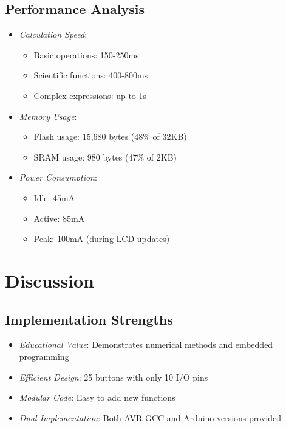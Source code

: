 \documentclass{article}
\begin{document}
\subsection{Performance Analysis}
\begin{itemize}[leftmargin=*]
    \item \textit{Calculation Speed}:
    \begin{itemize}[leftmargin=*]
        \item Basic operations: 150-250ms
        \item Scientific functions: 400-800ms
        \item Complex expressions: up to 1s
    \end{itemize}
    
    \item \textit{Memory Usage}:
    \begin{itemize}[leftmargin=*]
        \item Flash usage: 15,680 bytes (48\% of 32KB)
        \item SRAM usage: 980 bytes (47\% of 2KB)
    \end{itemize}
    
    \item \textit{Power Consumption}:
    \begin{itemize}[leftmargin=*]
        \item Idle: 45mA
        \item Active: 85mA
        \item Peak: 100mA (during LCD updates)
    \end{itemize}
\end{itemize}

\section{Discussion}
\subsection{Implementation Strengths}
\begin{itemize}[leftmargin=*]
    \item \textit{Educational Value}: Demonstrates numerical methods and embedded programming
    \item \textit{Efficient Design}: 25 buttons with only 10 I/O pins
    \item \textit{Modular Code}: Easy to add new functions
    \item \textit{Dual Implementation}: Both AVR-GCC and Arduino versions provided
\end{itemize}
\end{document}
